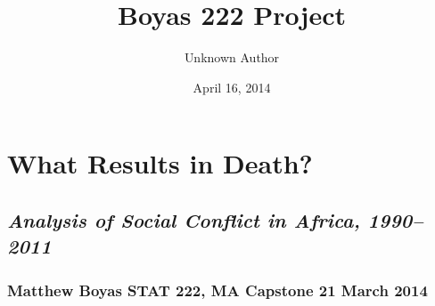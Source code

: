 \documentclass[letterpaper,10pt,english]{/usr/share/sphinx/texinputs/sphinxhowto}
\title{Boyas 222 Project}
\date{April 16, 2014}
\author{Unknown Author}
\begin{document}
        
            \maketitle
        

        


        
        \section{What Results in Death?}

\subsection{\emph{Analysis of Social Conflict in Africa, 1990--2011}}

\subsubsection{Matthew Boyas STAT 222, MA Capstone 21 March 2014}

\end{document}
